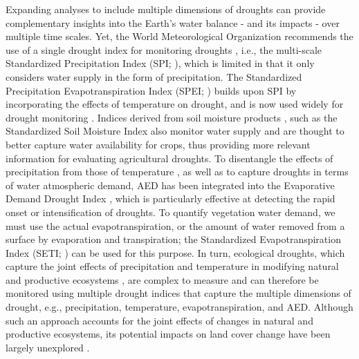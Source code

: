 \documentclass[
  sn-nature,
  numbered]{sn-jnl}
\begin{document}
Expanding analyses to include multiple dimensions of droughts can
provide complementary insights into the Earth's water balance - and its
impacts - over multiple time scales. Yet, the World Meteorological
Organization recommends the use of a single drought index for monitoring
droughts \citep{WMO2012}, i.e., the multi-scale Standardized
Precipitation Index (SPI; \citep{McKee1993}), which is limited in that
it only considers water supply in the form of precipitation. The
Standardized Precipitation Evapotranspiration Index (SPEI;
\citep{Vicente-Serrano2020}) builds upon SPI by incorporating the
effects of temperature on drought, and is now used widely for drought
monitoring \citep[e.g.,][]{Gebrechorkos2023, Liu2024}. Indices derived
from soil moisture products \citep{Narasimhan2005, Souza2021}, such as
the Standardized Soil Moisture Index
\citep[SSI,][]{AghaKouchak2014, AghaKouchak2015} also monitor water
supply and are thought to better capture water availability for crops,
thus providing more relevant information for evaluating agricultural
droughts. To disentangle the effects of precipitation from those of
temperature \citep{Vicente-Serrano2020}, as well as to capture droughts
in terms of water atmospheric demand, AED has been integrated into the
Evaporative Demand Drought Index \citep[EDDI,][]{McEvoy2016}, which is
particularly effective at detecting the rapid onset or intensification
of droughts. To quantify vegetation water demand, we must use the actual
evapotranspiration, or the amount of water removed from a surface by
evaporation and transpiration; the Standardized Evapotranspiration Index
(SETI; \citep{Yang2019}) can be used for this purpose. In turn,
ecological droughts, which capture the joint effects of precipitation
and temperature in modifying natural and productive ecosystems
\citep{Camps-Valls2021, Paruelo2016, Helman2014}, are complex to measure
and can therefore be monitored using multiple drought indices that
capture the multiple dimensions of drought, e.g., precipitation,
temperature, evapotranspiration, and AED. Although such an approach
accounts for the joint effects of changes in natural and productive
ecosystems, its potential impacts on land cover change have been largely
unexplored \citep{Tollerud2018, Marumbwa2020}.
\end{document}
